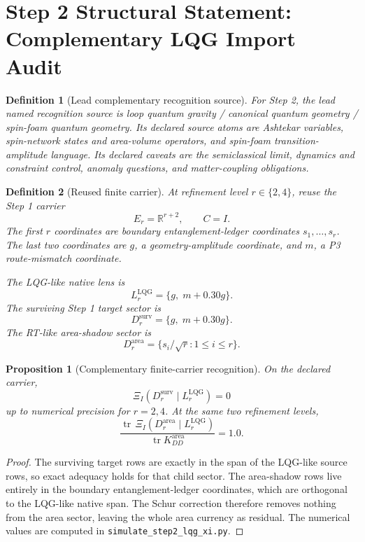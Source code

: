 \documentclass[11pt]{article}
\newtheorem{definition}{Definition}
\newtheorem{proposition}{Proposition}
\DeclareMathOperator{\tr}{tr}
\begin{document}
\section*{Step 2 Structural Statement: Complementary LQG Import Audit}

\begin{definition}[Lead complementary recognition source]
For Step 2, the lead named recognition source is loop quantum gravity /
canonical quantum geometry / spin-foam quantum geometry.  Its declared source
atoms are Ashtekar variables, spin-network states and area-volume operators,
and spin-foam transition-amplitude language.  Its declared caveats are the
semiclassical limit, dynamics and constraint control, anomaly questions, and
matter-coupling obligations.
\end{definition}

\begin{definition}[Reused finite carrier]
At refinement level \(r\in\{2,4\}\), reuse the Step 1 carrier
\[
  E_r=\mathbb{R}^{r+2},\qquad C=I.
\]
The first \(r\) coordinates are boundary entanglement-ledger coordinates
\(s_1,\ldots,s_r\).  The last two coordinates are \(g\), a
geometry-amplitude coordinate, and \(m\), a P3 route-mismatch coordinate.

The LQG-like native lens is
\[
  L^{\mathrm{LQG}}_r=\{g,\;m+0.30g\}.
\]
The surviving Step 1 target sector is
\[
  D^{\mathrm{surv}}_r=\{g,\;m+0.30g\}.
\]
The RT-like area-shadow sector is
\[
  D^{\mathrm{area}}_r=\{s_i/\sqrt r:1\le i\le r\}.
\]
\end{definition}

\begin{proposition}[Complementary finite-carrier recognition]
On the declared carrier,
\[
  \Xi_I(D^{\mathrm{surv}}_r\mid L^{\mathrm{LQG}}_r)=0
\]
up to numerical precision for \(r=2,4\).  At the same two refinement levels,
\[
  \frac{\tr\,\Xi_I(D^{\mathrm{area}}_r\mid L^{\mathrm{LQG}}_r)}
       {\tr K_{DD}^{\mathrm{area}}}=1.0 .
\]
\end{proposition}

\begin{proof}
The surviving target rows are exactly in the span of the LQG-like source rows,
so exact adequacy holds for that child sector.  The area-shadow rows live
entirely in the boundary entanglement-ledger coordinates, which are orthogonal
to the LQG-like native span.  The Schur correction therefore removes nothing
from the area sector, leaving the whole area currency as residual.  The
numerical values are computed in \texttt{simulate\_step2\_lqg\_xi.py}.
\end{proof}
\end{document}
